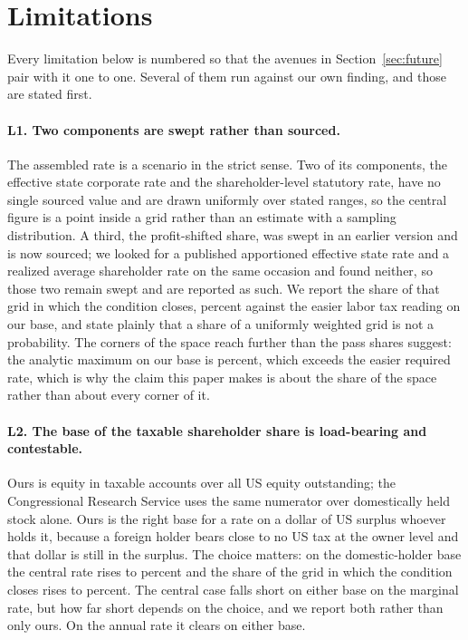 \section{Limitations}
\label{sec:limitations}

Every limitation below is numbered so that the avenues in Section~\ref{sec:future} pair with it
one to one. Several of them run against our own finding, and those are stated first.

\paragraph{L1. Two components are swept rather than sourced.} The assembled rate is a scenario
in the strict sense. Two of its components, the effective state corporate rate and the
shareholder-level statutory rate, have no single sourced value and are drawn uniformly over
stated ranges, so the central figure is a point inside a grid rather than an estimate with a
sampling distribution. A third, the profit-shifted share, was swept in an earlier version and is
now sourced; we looked for a published apportioned effective state rate and a realized average
shareholder rate on the same occasion and found neither, so those two remain swept and are
reported as such. We report the share of that grid in which the condition
closes,  percent against the easier labor tax reading on our base, and
state plainly that a share of a uniformly weighted grid is not a probability. The corners of the
space reach further than the pass shares suggest: the analytic maximum on our base is
 percent, which exceeds the easier required rate, which is why the claim
this paper makes is about the share of the space rather than about every corner of it.

\paragraph{L2. The base of the taxable shareholder share is load-bearing and contestable.} Ours
is equity in taxable accounts over all US equity outstanding; the Congressional Research Service
uses the same numerator over domestically held stock alone. Ours is the right base for a rate on
a dollar of US surplus whoever holds it, because a foreign holder bears close to no US tax at the
owner level and that dollar is still in the surplus. The choice matters: on the domestic-holder
base the central rate rises to  percent and the share of the grid in which
the condition closes rises to  percent. The central case falls short on
either base on the marginal rate, but how far short depends on the choice, and we report both
rather than only ours. On the annual rate it clears on either base.

